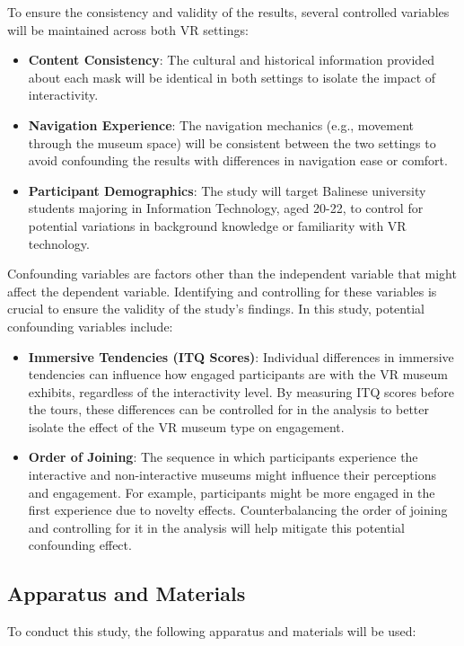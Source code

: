 \documentclass[conference]{IEEEtran}
\begin{document}
To ensure the consistency and validity of the results, several controlled variables will be maintained across both VR settings:

\begin{itemize}
    \item \textbf{Content Consistency}: The cultural and historical information provided about each mask will be identical in both settings to isolate the impact of interactivity.
    \item \textbf{Navigation Experience}: The navigation mechanics (e.g., movement through the museum space) will be consistent between the two settings to avoid confounding the results with differences in navigation ease or comfort.
    \item \textbf{Participant Demographics}: The study will target Balinese university students majoring in Information Technology, aged 20-22, to control for potential variations in background knowledge or familiarity with VR technology.
\end{itemize}

Confounding variables are factors other than the independent variable that might affect the dependent variable. Identifying and controlling for these variables is crucial to ensure the validity of the study's findings. In this study, potential confounding variables include:

\begin{itemize}
    \item \textbf{Immersive Tendencies (ITQ Scores)}: Individual differences in immersive tendencies can influence how engaged participants are with the VR museum exhibits, regardless of the interactivity level. By measuring ITQ scores before the tours, these differences can be controlled for in the analysis to better isolate the effect of the VR museum type on engagement.
    \item \textbf{Order of Joining}: The sequence in which participants experience the interactive and non-interactive museums might influence their perceptions and engagement. For example, participants might be more engaged in the first experience due to novelty effects. Counterbalancing the order of joining and controlling for it in the analysis will help mitigate this potential confounding effect.
\end{itemize}
\subsection{Apparatus and Materials}
To conduct this study, the following apparatus and materials will be used:
\end{document}
